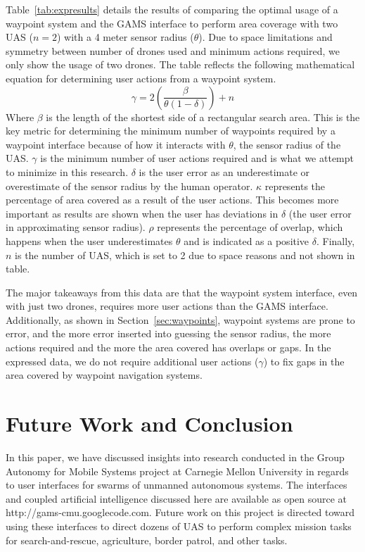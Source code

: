 \documentclass{sig-alternate-ipsn13}
\begin{document}
Table~\ref{tab:expresults} details the results of comparing the optimal usage of
a waypoint system and the GAMS interface to perform area coverage with
two UAS ($n=2$) with a 4 meter sensor radius ($\theta$). Due to space limitations and
symmetry between number of drones used and minimum actions required, we
only show the usage of two drones. The table reflects the following
mathematical equation for determining user actions from a waypoint system.
%
\[
\gamma = 2 \left (\frac {\beta} {\theta (1 - \delta)} \right) + n
\]
%
Where $\beta$ is the length of the shortest side of a rectangular search area.
This is the key metric for determining the minimum number of waypoints required
by a waypoint interface
because of how it interacts with $\theta$, the sensor radius of the UAS. $\gamma$ is
the minimum number of user actions required and is what we attempt to minimize in this
research. $\delta$ is
the user error as an underestimate or overestimate of the sensor radius by the
human operator. $\kappa$ represents the percentage of area covered as a result
of the user actions. This becomes more important as results are shown when the
user has deviations in $\delta$ (the user error in approximating sensor radius).
$\rho$ represents the percentage of overlap, which happens when the user
underestimates $\theta$ and is indicated as a positive $\delta$.
Finally,
$n$ is the number of UAS, which is set to 2 due to space reasons and not shown in table.

The major takeaways from this data are that the waypoint system interface, even
with just two drones, requires more user actions than the GAMS interface.
Additionally, as shown in Section~\ref{sec:waypoints}, waypoint systems are prone to
error, and the more error inserted into guessing the sensor radius, the more actions
required and the more the area covered has overlaps or gaps. In the expressed data,
we do not require additional user actions ($\gamma$) to fix gaps in the area covered
by waypoint navigation systems.


\section{Future Work and Conclusion}
\label{sec:conc}

In this paper, we have discussed insights into research conducted in the Group
Autonomy for Mobile Systems project at Carnegie Mellon University in regards
to user interfaces for swarms of unmanned autonomous systems. The interfaces
and coupled artificial intelligence discussed here are available as open source at
http://gams-cmu.googlecode.com. Future work on this project is directed toward
using these interfaces to direct dozens of UAS to perform complex mission tasks
for search-and-rescue, agriculture, border patrol, and other tasks.
\end{document}
